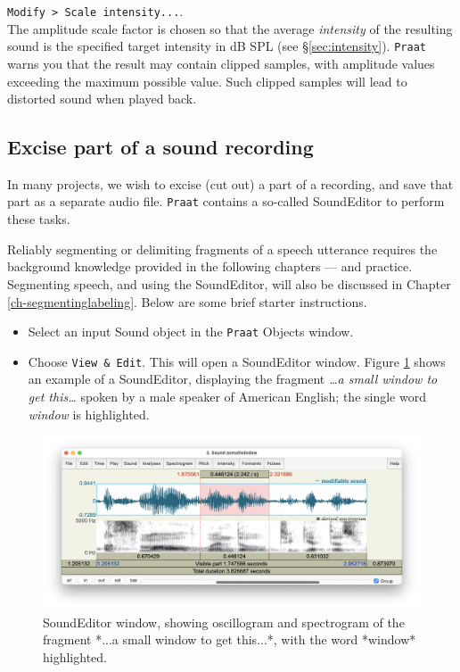 \documentclass[
]{book}
\begin{document}
\texttt{Modify\ \textgreater{}\ Scale\ intensity...}.\\
The amplitude scale factor is chosen so that the average \emph{intensity} of the resulting sound is the specified target intensity in dB SPL (see §\ref{sec:intensity}). \texttt{Praat} warns you that the result may contain clipped samples, with amplitude values exceeding the maximum possible value. Such clipped samples will lead to distorted sound when played back.

\subsection{Excise part of a sound recording}\label{excise-part-of-a-sound-recording}

In many projects, we wish to excise (cut out) a part of a recording, and save that part as a separate audio file.
\texttt{Praat} contains a so-called SoundEditor to perform these tasks.

\label{box-segmenting}
Reliably segmenting or delimiting fragments of a speech utterance requires the background knowledge provided in the following chapters --- and practice. Segmenting speech, and using the SoundEditor, will also be discussed in Chapter \ref{ch-segmentinglabeling}. Below are some brief starter instructions.

\label{box-soundeditor}
\begin{itemize}
\item
  Select an input Sound object in the \texttt{Praat} Objects window.
\item
  Choose \texttt{View\ \&\ Edit}.
  This will open a SoundEditor window.
  Figure \ref{fig:window-soundeditor} shows an example of a SoundEditor, displaying the fragment \emph{\ldots a small window to get this\ldots{}} spoken by a male speaker of American English; the single word \emph{window} is highlighted.
\end{itemize}

\begin{figure}

{\centering \includegraphics{figures/asmallwindowtogetthis_SoundEditor2050124} 

}

\caption{SoundEditor window, showing oscillogram and spectrogram of the fragment *...a small window to get this...*, with the word *window* highlighted.}\label{fig:window-soundeditor}
\end{figure}
\end{document}

